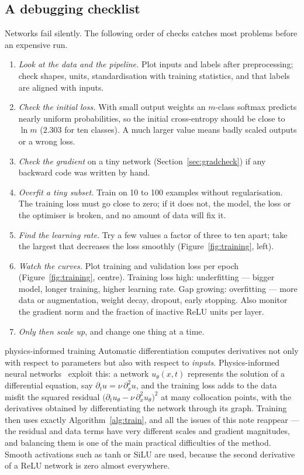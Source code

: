 \documentclass[11pt]{article}
\begin{document}
\subsection{A debugging checklist}\label{sec:debug}

Networks fail silently. The following order of checks catches most problems before an expensive run.
\begin{enumerate}
\item \emph{Look at the data and the pipeline.} Plot inputs and labels after preprocessing; check shapes, units,
  standardisation with training statistics, and that labels are aligned with inputs.
\item \emph{Check the initial loss.} With small output weights an $m$-class softmax predicts nearly uniform
  probabilities, so the initial cross-entropy should be close to $\ln m$ ($2.303$ for ten classes). A much larger value
  means badly scaled outputs or a wrong loss.
\item \emph{Check the gradient} on a tiny network (Section~\ref{sec:gradcheck}) if any backward code was written by hand.
\item \emph{Overfit a tiny subset.} Train on 10 to 100 examples without regularisation. The training loss must go close
  to zero; if it does not, the model, the loss or the optimiser is broken, and no amount of data will fix it.
\item \emph{Find the learning rate.} Try a few values a factor of three to ten apart; take the largest that decreases the
  loss smoothly (Figure~\ref{fig:training}, left).
\item \emph{Watch the curves.} Plot training and validation loss per epoch (Figure~\ref{fig:training}, centre). Training loss
  high: underfitting --- bigger model, longer training, higher learning rate. Gap growing: overfitting --- more data or
  augmentation, weight decay, dropout, early stopping. Also monitor the gradient norm and the fraction of inactive ReLU
  units per layer.
\item \emph{Only then scale up}, and change one thing at a time.
\end{enumerate}

\begin{physics}{physics-informed training}
Automatic differentiation computes derivatives not only with respect to parameters but also with respect to
\emph{inputs}. Physics-informed neural networks~\cite{raissi2019} exploit this: a network $u_\theta(x, t)$ represents the
solution of a differential equation, say $\partial_t u = \nu\,\partial_x^2u$, and the training loss adds to the data misfit
the squared residual $\big(\partial_tu_\theta - \nu\,\partial_x^2u_\theta\big)^2$ at many collocation points, with the
derivatives obtained by differentiating the network through its graph. Training then uses exactly
Algorithm~\ref{alg:train}, and all the issues of this note reappear --- the residual and data terms have very different
scales and gradient magnitudes, and balancing them is one of the main practical difficulties of the method. Smooth
activations such as tanh or SiLU are used, because the second derivative of a ReLU network is zero almost everywhere.
\end{physics}
\end{document}
